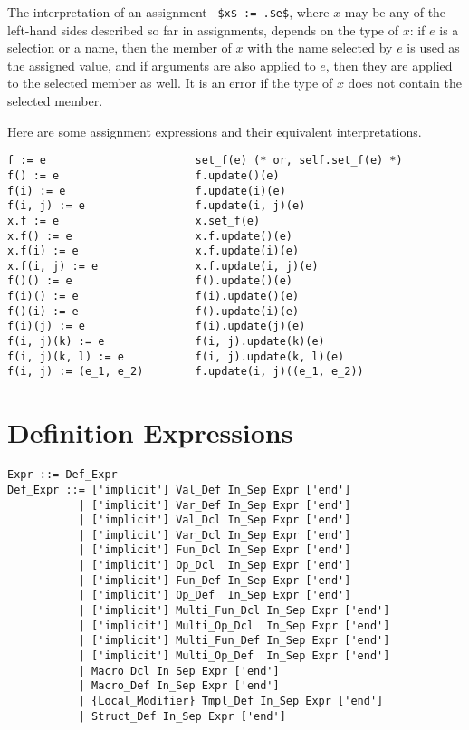 The interpretation of an assignment ~\lstinline!$x$ := .$e$!, where $x$ may be any of the left-hand sides described so far in assignments, depends on the type of $x$: if $e$ is a selection or a name, then the member of $x$ with the name selected by $e$ is used as the assigned value, and if arguments are also applied to $e$, then they are applied to the selected member as well. It is an error if the type of $x$ does not contain the selected member. 

\example Here are some assignment expressions and their equivalent interpretations. 
\begin{lstlisting}
f := e                       set_f(e) (* or, self.set_f(e) *)
f() := e                     f.update()(e)
f(i) := e                    f.update(i)(e)
f(i, j) := e                 f.update(i, j)(e)
x.f := e                     x.set_f(e)
x.f() := e                   x.f.update()(e)
x.f(i) := e                  x.f.update(i)(e)
x.f(i, j) := e               x.f.update(i, j)(e)
f()() := e                   f().update()(e)
f(i)() := e                  f(i).update()(e)
f()(i) := e                  f().update(i)(e)
f(i)(j) := e                 f(i).update(j)(e)
f(i, j)(k) := e              f(i, j).update(k)(e)
f(i, j)(k, l) := e           f(i, j).update(k, l)(e)
f(i, j) := (e_1, e_2)        f.update(i, j)((e_1, e_2))
\end{lstlisting}





\section{Definition Expressions}
\label{sec:def-expressions}

\syntax\begin{lstlisting}
Expr ::= Def_Expr
Def_Expr ::= ['implicit'] Val_Def In_Sep Expr ['end']
           | ['implicit'] Var_Def In_Sep Expr ['end']
           | ['implicit'] Val_Dcl In_Sep Expr ['end']
           | ['implicit'] Var_Dcl In_Sep Expr ['end']
           | ['implicit'] Fun_Dcl In_Sep Expr ['end']
           | ['implicit'] Op_Dcl  In_Sep Expr ['end']
           | ['implicit'] Fun_Def In_Sep Expr ['end']
           | ['implicit'] Op_Def  In_Sep Expr ['end']
           | ['implicit'] Multi_Fun_Dcl In_Sep Expr ['end']
           | ['implicit'] Multi_Op_Dcl  In_Sep Expr ['end']
           | ['implicit'] Multi_Fun_Def In_Sep Expr ['end']
           | ['implicit'] Multi_Op_Def  In_Sep Expr ['end']
           | Macro_Dcl In_Sep Expr ['end']
           | Macro_Def In_Sep Expr ['end']
           | {Local_Modifier} Tmpl_Def In_Sep Expr ['end']
           | Struct_Def In_Sep Expr ['end']
\end{lstlisting}





